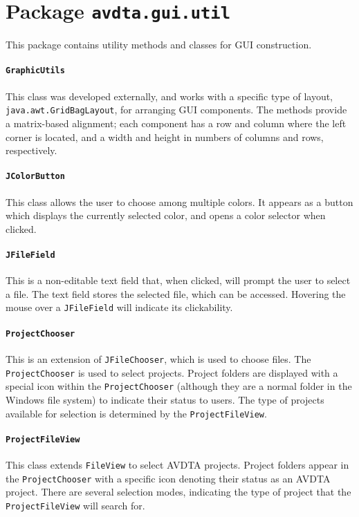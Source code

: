 \section{Package \texttt{avdta.gui.util}}
\label{api:util}

This package contains utility methods and classes for GUI construction.

\paragraph*{\texttt{GraphicUtils}} This class was developed externally, and works with a specific type of layout, \texttt{java.awt.GridBagLayout}, for arranging GUI components. The methods provide a matrix-based alignment; each component has a row and column where the left corner is located, and a width and height in numbers of columns and rows, respectively.

\paragraph*{\texttt{JColorButton}}
This class allows the user to choose among multiple colors. It appears as a button which displays the currently selected color, and opens a color selector when clicked. 

\paragraph*{\texttt{JFileField}}
This is a non-editable text field that, when clicked, will prompt the user to select a file. The text field stores the selected file, which can be accessed. Hovering the mouse over a \texttt{JFileField} will indicate its clickability.

\paragraph*{\texttt{ProjectChooser}}
This is an extension of \texttt{JFileChooser}, which is used to choose files. The \texttt{ProjectChooser} is used to select projects. Project folders are displayed with a special icon within the \texttt{ProjectChooser} (although they are a normal folder in the Windows file system) to indicate their status to users. The type of projects available for selection is determined by the \texttt{ProjectFileView}.

\paragraph*{\texttt{ProjectFileView}}
This class extends \texttt{FileView} to select AVDTA projects. Project folders appear in the \texttt{ProjectChooser} with a specific icon denoting their status as an AVDTA project. There are several selection modes, indicating the type of project that the \texttt{ProjectFileView} will search for. 

